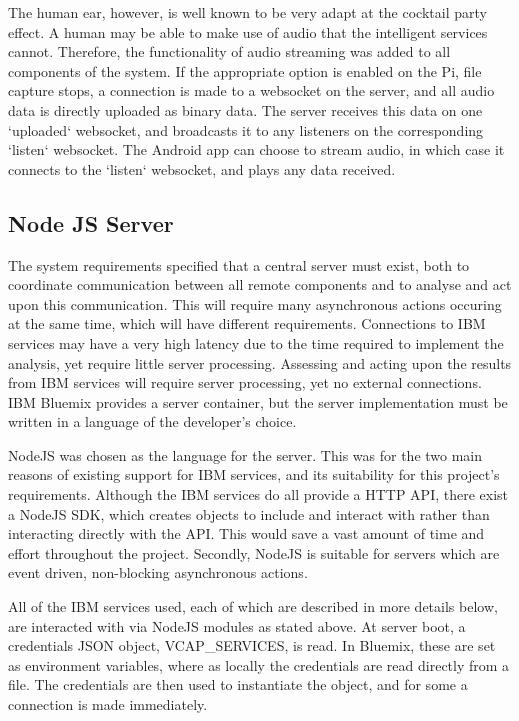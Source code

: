 \documentclass{article}
\begin{document}
The human ear, however, is well known to be very adapt at the cocktail party effect\cite{cocktailParty}. A human may be able to make use of audio that the intelligent services cannot. Therefore, the functionality of audio streaming was added to all components of the system. If the appropriate option is enabled on the Pi, file capture stops, a connection is made to a websocket on the server, and all audio data is directly uploaded as binary data. The server receives this data on one `uploaded` websocket, and broadcasts it to any listeners on the corresponding `listen` websocket. The Android app can choose to stream audio, in which case it connects to the `listen` websocket, and plays any data received.

\subsection{Node JS Server}
The system requirements specified that a central server must exist, both to coordinate communication between all remote components and to analyse and act upon this communication. This will require many asynchronous actions occuring at the same time, which will have different requirements. Connections to IBM services may have a very high latency due to the time required to implement the analysis, yet require little server processing. Assessing and acting upon the results from IBM services will require server processing, yet no external connections. IBM Bluemix provides a server container, but the server implementation must be written in a language of the developer's choice. 

NodeJS was chosen as the language for the server. This was for the two main reasons of existing support for IBM services, and its suitability for this project's requirements. Although the IBM services do all provide a HTTP API, there exist a NodeJS SDK, which creates objects to include and interact with rather than interacting directly with the API\cite{githubWatsonCloud}\cite{githubCloudant}\cite{githubDB2}. This would save a vast amount of time and effort throughout the project. Secondly, NodeJS is suitable for servers which are event driven, non-blocking asynchronous actions\cite{smackdownPHPNodejs}.  

All of the IBM services used, each of which are described in more details below, are interacted with via NodeJS modules as stated above. At server boot, a credentials JSON object, VCAP\_SERVICES, is read. In Bluemix, these are set as environment variables, where as locally the credentials are read directly from a file. The credentials are then used to instantiate the object, and for some a connection is made immediately.
\end{document}
